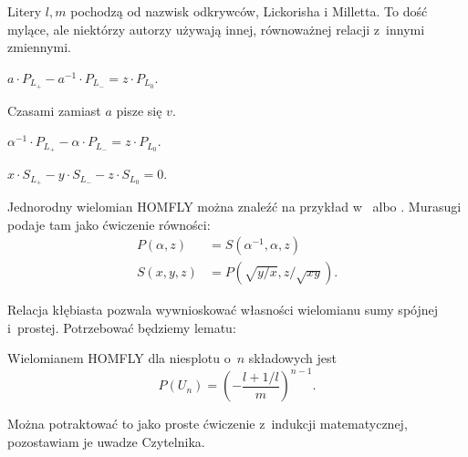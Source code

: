 Litery $l, m$ pochodzą od nazwisk odkrywców, Lickorisha i Milletta.
To dość mylące, ale niektórzy autorzy używają innej, równoważnej relacji z~innymi zmiennymi.

\begin{definition}
    $a \cdot P_{L_+} - a^{-1} \cdot P_{L_-} = z \cdot P_{L_0}$.
\end{definition}

Czasami zamiast $a$ pisze się $v$.

\begin{definition}
    $\alpha^{-1} \cdot P_{L_+} - \alpha \cdot P_{L_-} = z \cdot P_{L_0}$.
\end{definition}

\begin{definition}
    $x \cdot S_{L_+} - y \cdot S_{L_-} - z \cdot S_{L_0} = 0$.
\end{definition}

Jednorodny wielomian HOMFLY można znaleźć na przykład w~\cite[s. 10]{millett88} albo \cite[s. 231]{murasugi96}.
Murasugi podaje tam jako ćwiczenie równości:
%
\begin{align}
    P(\alpha, z) & = S(\alpha^{-1}, \alpha, z) \\
    S(x, y, z) & = P(\sqrt{y/x}, z/\sqrt{xy}).
\end{align}


Relacja kłębiasta pozwala wywnioskować własności wielomianu sumy spójnej i~prostej.
Potrzebować będziemy lematu:

\begin{lemma}
    \label{lem:homfly_unlinks}
    Wielomianem HOMFLY dla niesplotu o~$n$ składowych jest
    \begin{equation}
        P(U_n) = \left(-\frac{l+1/l}{m}\right)^{n-1}.
    \end{equation}
\end{lemma}

Można potraktować to jako proste ćwiczenie z~indukcji matematycznej, pozostawiam je uwadze Czytelnika.

